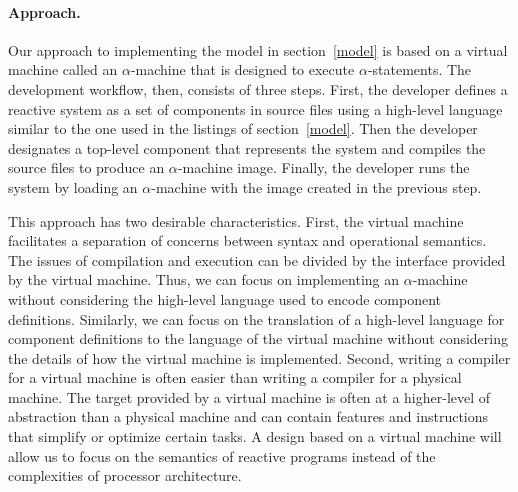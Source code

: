 \paragraph{Approach.}
Our approach to implementing the model in section~\ref{model} is based on a virtual machine called an $\alpha$-machine that is designed to execute $\alpha$-statements.
The development workflow, then, consists of three steps.
First, the developer defines a reactive system as a set of components in source files using a high-level language similar to the one used in the listings of section~\ref{model}.
Then the developer designates a top-level component that represents the system and compiles the source files to produce an $\alpha$-machine image.
Finally, the developer runs the system by loading an $\alpha$-machine with the image created in the previous step.

This approach has two desirable characteristics.
First, the virtual machine facilitates a separation of concerns between syntax and operational semantics.
The issues of compilation and execution can be divided by the interface provided by the virtual machine.
Thus, we can focus on implementing an $\alpha$-machine without considering the high-level language used to encode component definitions.
Similarly, we can focus on the translation of a high-level language for component definitions to the language of the virtual machine without considering the details of how the virtual machine is implemented.
Second, writing a compiler for a virtual machine is often easier than writing a compiler for a physical machine.
The target provided by a virtual machine is often at a higher-level of abstraction than a physical machine and can contain features and instructions that simplify or optimize certain tasks.
A design based on a virtual machine will allow us to focus on the semantics of reactive programs instead of the complexities of processor architecture.

